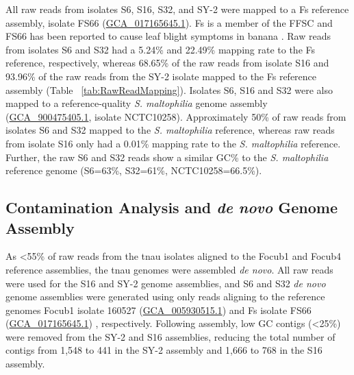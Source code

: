 All raw reads from isolates S6, S16, S32, and SY-2 were mapped to a \acf{Fs} reference assembly, isolate FS66 (\href{https://www.ncbi.nlm.nih.gov/datasets/genome/GCA_017165645.1/}{GCA\_017165645.1}). \ac{Fs} is a member of the \ac{FFSC} and FS66 has been reported to cause leaf blight symptoms in banana \parencite{Cui2021}. Raw reads from isolates S6 and S32 had a 5.24\% and 22.49\% mapping rate to the \ac{Fs} reference, respectively, whereas 68.65\% of the raw reads from isolate S16 and 93.96\% of the raw reads from the SY-2 isolate mapped to the \ac{Fs} reference assembly (Table ~\ref{tab:RawReadMapping}). Isolates S6, S16 and S32 were also mapped to a reference-quality \textit{S. maltophilia} genome assembly (\href{https://www.ncbi.nlm.nih.gov/datasets/genome/GCF_900475405.1/}{GCA\_900475405.1}, isolate NCTC10258). Approximately 50\% of raw reads from isolates S6 and S32 mapped to the \textit{S. maltophilia} reference, whereas raw reads from isolate S16 only had a 0.01\% mapping rate to the \textit{S. maltophilia} reference. Further, the raw S6 and S32 reads show a similar GC\% to the \textit{S. maltophilia} reference genome (S6=63\%, S32=61\%, NCTC10258=66.5\%).

\bigskip


\subsection{Contamination Analysis and \textit{de novo} Genome Assembly}

As <55\% of raw reads from the \ac{tnau} isolates aligned to the \ac{Focub1} and \ac{Focub4} reference assemblies, the \ac{tnau} genomes were assembled \textit{de novo}. All raw reads were used for the S16 and SY-2 genome assemblies, and S6 and S32 \textit{de novo} genome assemblies were generated using only reads aligning to the reference genomes \ac{Focub1} isolate 160527 (\href{https://www.ncbi.nlm.nih.gov/datasets/genome/GCA_005930515.1/}{GCA\_005930515.1}) \parencite{Asai2019} and \ac{Fs} isolate FS66 (\href{https://www.ncbi.nlm.nih.gov/datasets/genome/GCA_017165645.1/}{GCA\_017165645.1}) \parencite{Cui2021}, respectively. Following assembly, low GC contigs  (\textless 25\%) were removed from the SY-2 and S16 assemblies, reducing the total number of contigs from 1,548 to 441 in the SY-2 assembly and 1,666 to 768 in the S16 assembly.  

